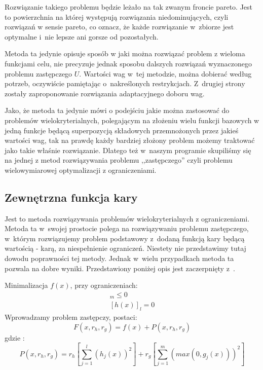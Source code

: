 \documentclass{classrep}
\begin{document}
Rozwiązanie takiego problemu będzie leżało na tak zwanym froncie pareto. Jest to powierzchnia na której występują rozwiązania niedominujących, czyli rozwiązań w sensie pareto, co oznacz, że każde rozwiązanie w~zbiorze jest optymalne i~nie lepsze ani gorsze od pozostałych.
 
Metoda ta jedynie opisuje sposób w jaki można rozwiązać problem z wieloma funkcjami celu, nie precyzuje jednak sposobu dalszych rozwiązań   wyznaczonego problemu zastępczego $U$. Wartości wag w~tej metodzie, można dobierać według potrzeb, oczywiście pamiętając o~nakreślonych restrykcjach. Z~drugiej strony zostały zaproponowanie rozwiązania adaptacyjnego doboru wag.

Jako, że metoda ta jedynie mówi o podejściu jakie można zastosować do problemów wielokryterialnych, polegającym na złożeniu wielu funkcji bazowych w jedną funkcje będącą superpozycją składowych przemnożonych przez jakieś wartości wag, tak na prawdę każdy bardziej złożony problem możemy traktować jako takie właśnie rozwiązanie. Dlatego też w~naszym programie skupiliśmy się na jednej z metod rozwiązywania problemu ,,zastępczego'' czyli problemu wielowymiarowej optymalizacji z ograniczeniami.

\subsection{Zewnętrzna funkcja kary}
Jest to metoda rozwiązywania problemów wielokryterialnych z ograniczeniami. Metoda ta w~swojej prostocie polega na rozwiązywaniu problemu zastępczego, w~którym rozwiązujemy problem podstawowy z~dodaną funkcją kary będącą wartością - karą, za niespełnienie ograniczeń. Niestety nie przedstawimy tutaj dowodu poprawności tej metody. Jednak w~wielu przypadkach metoda ta pozwala na dobre wyniki. Przedstawiony poniżej opis jest zaczerpnięty z~\cite{3}.

\noindent Minimalizacja $f(x)$, przy ograniczeniach:
\begin{align}
[g(x)]_m\leq0 \nonumber\\
 [h(x)]_l=0 \nonumber
\end{align}
\noindent Wprowadzamy problem zastępczy, postaci: 
\begin{equation}
F(x,r_h, r_g) = f(x) + P(x,r_h, r_g)
\end{equation}
\noindent  gdzie : 
\begin{equation}
P(x,r_h, r_g)=r_h \left[ \sum \limits ^{l} _{j=1} (h_j(x))^{2} \right]  + r_g \left[ \sum \limits ^{m} _{j=1}
 \left( max \left( 0, g_j (x) \right) \right) ^{2} \right]
\end{equation}
\end{document}
